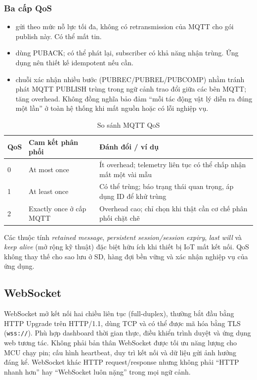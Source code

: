 \subsubsection{Ba cấp QoS}
\begin{itemize}
\item {} gửi theo mức nỗ lực tối đa, không có retransmission của MQTT cho gói publish này. Có thể mất tin.
\item {} dùng PUBACK; có thể phát lại, subscriber có khả năng nhận trùng. Ứng dụng nên thiết kế idempotent nếu cần.
\item {} chuỗi xác nhận nhiều bước (PUBREC/PUBREL/PUBCOMP) nhằm tránh phát MQTT PUBLISH trùng trong ngữ cảnh trao đổi giữa các bên MQTT; tăng overhead. Không đồng nghĩa bảo đảm ``mỗi tác động vật lý diễn ra đúng một lần'' ở toàn hệ thống khi mất nguồn hoặc có lỗi nghiệp vụ.
\end{itemize}
\begin{table}[htbp]\centering\small\caption{So sánh MQTT QoS}
\begin{tabularx}{\textwidth}{@{}p{16mm}p{35mm}X@{}}\toprule
QoS & Cam kết phân phối & Đánh đổi / ví dụ\\\midrule
0 & At most once & Ít overhead; telemetry liên tục có thể chấp nhận mất một vài mẫu\\
1 & At least once & Có thể trùng; báo trạng thái quan trọng, áp dụng ID để khử trùng\\
2 & Exactly once ở cấp MQTT & Overhead cao; chỉ chọn khi thật cần cơ chế phân phối chặt chẽ\\\bottomrule
\end{tabularx}
\end{table}
\begin{note}
Các thuộc tính \emph{retained message}, \emph{persistent session/session expiry}, \emph{last will} và \emph{keep alive} (mở rộng kỹ thuật) đặc biệt hữu ích khi thiết bị IoT mất kết nối. QoS không thay thế cho sao lưu ở SD, hàng đợi bền vững và xác nhận nghiệp vụ của ứng dụng.
\end{note}
\subsection{WebSocket}
WebSocket mở kết nối hai chiều liên tục (full-duplex), thường bắt đầu bằng HTTP Upgrade trên HTTP/1.1, dùng TCP và có thể được mã hóa bằng TLS (\texttt{wss://}). Phù hợp dashboard thời gian thực, điều khiển trình duyệt và ứng dụng web tương tác. Không phải bản thân WebSocket được tối ưu năng lượng cho MCU chạy pin; cấu hình heartbeat, duy trì kết nối và dữ liệu gửi ảnh hưởng đáng kể. WebSocket khác HTTP request/response nhưng không phải ``HTTP nhanh hơn'' hay ``WebSocket luôn nặng'' trong mọi ngữ cảnh.
